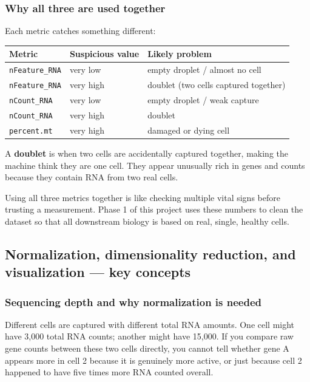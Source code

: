 \documentclass[11pt, a4paper]{article}
\begin{document}
\subsubsection{Why all three are used together}

Each metric catches something different:

\medskip
\noindent
\begin{tabular}{@{}p{3.2cm}p{3.5cm}p{5.5cm}@{}}
\toprule
\textbf{Metric} & \textbf{Suspicious value} & \textbf{Likely problem} \\
\midrule
\texttt{nFeature\_RNA} & very low & empty droplet / almost no cell \\
\texttt{nFeature\_RNA} & very high & doublet (two cells captured together) \\
\texttt{nCount\_RNA} & very low & empty droplet / weak capture \\
\texttt{nCount\_RNA} & very high & doublet \\
\texttt{percent.mt} & very high & damaged or dying cell \\
\bottomrule
\end{tabular}

\medskip
A \textbf{doublet} is when two cells are accidentally captured together, making the
machine think they are one cell. They appear unusually rich in genes and counts
because they contain RNA from two real cells.

Using all three metrics together is like checking multiple vital signs before trusting
a measurement. Phase 1 of this project uses these numbers to clean the dataset so
that all downstream biology is based on real, single, healthy cells.

\subsection{Normalization, dimensionality reduction, and visualization — key concepts}

\subsubsection{Sequencing depth and why normalization is needed}

Different cells are captured with different total RNA amounts.
One cell might have 3,000 total RNA counts; another might have 15,000.
If you compare raw gene counts between these two cells directly, you cannot tell
whether gene A appears more in cell 2 because it is genuinely more active,
or just because cell 2 happened to have five times more RNA counted overall.
\end{document}
